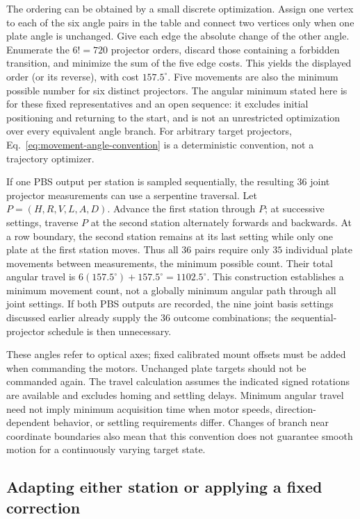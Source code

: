 \documentclass[a4paper,10pt]{article}
\begin{document}
The ordering can be obtained by a small discrete optimization. Assign
one vertex to each of the six angle pairs in the table and connect two
vertices only when one plate angle is unchanged. Give each edge the
absolute change of the other angle. Enumerate the $6!=720$ projector
orders, discard those containing a forbidden transition, and minimize
the sum of the five edge costs. This yields the displayed order (or its
reverse), with cost $157.5^\circ$. Five movements are also the minimum
possible number for six distinct projectors. The angular minimum stated
here is for these fixed representatives and an open sequence: it excludes
initial positioning and returning to the start, and is not an unrestricted
optimization over every equivalent angle branch. For arbitrary target
projectors, Eq.~\eqref{eq:movement-angle-convention} is a deterministic
convention, not a trajectory optimizer.

If one PBS output per station is sampled sequentially, the resulting
$36$ joint projector measurements can use a serpentine traversal. Let
$P=(H,R,V,L,A,D)$. Advance the first station through $P$; at successive
settings, traverse $P$ at the second station alternately forwards and
backwards. At a row boundary, the second station remains at its last
setting while only one plate at the first station moves. Thus all
$36$ pairs require only $35$ individual plate movements between
measurements, the minimum possible count. Their total angular travel is
$6(157.5^\circ)+157.5^\circ=1102.5^\circ$. This construction establishes
a minimum movement count, not a globally minimum angular path through
all joint settings. If both PBS outputs are recorded, the nine joint
basis settings discussed earlier already supply the $36$ outcome
combinations; the sequential-projector schedule is then unnecessary.

These angles refer to optical axes; fixed calibrated mount offsets must
be added when commanding the motors. Unchanged plate targets should not
be commanded again. The travel calculation assumes the indicated signed
rotations are available and excludes homing and settling delays. Minimum
angular travel need not imply minimum acquisition time when motor speeds,
direction-dependent behavior, or settling requirements differ. Changes
of branch near coordinate boundaries also mean that this convention does
not guarantee smooth motion for a continuously varying target state.

\subsection{Adapting either station or applying a fixed correction}
\end{document}
